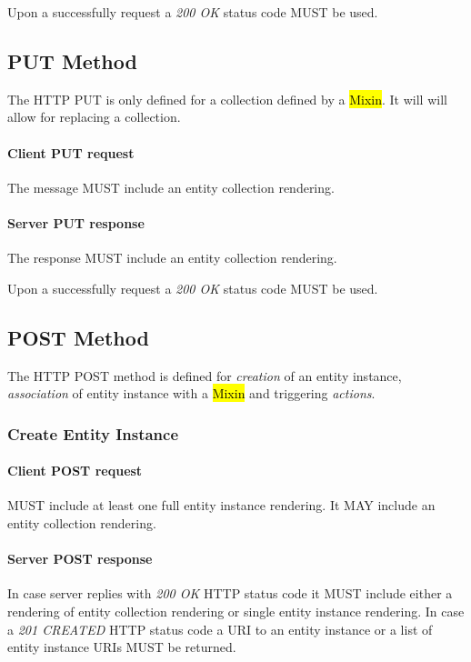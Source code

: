 \documentclass[10pt,a4paper]{article}
\begin{document}
Upon a successfully request a \emph{200 OK} status code MUST be used.

\subsection{PUT Method}
The HTTP PUT is only defined for a collection defined by a \hl{Mixin}. It will will allow for replacing a collection.

\paragraph{Client PUT request}
The message MUST include an entity collection rendering.

\paragraph{Server PUT response}
The response MUST include an entity collection rendering.

Upon a successfully request a \emph{200 OK} status code MUST be used.

\subsection{POST Method}
The HTTP POST method is defined for {\em creation} of an entity instance, {\em association} of entity instance with a \hl{Mixin} and triggering {\em actions}.

\subsubsection{Create Entity Instance}

\paragraph{Client POST request}
MUST include at least one full entity instance rendering. It MAY include an entity collection rendering.

\paragraph{Server POST response}
In case server replies with \emph{200 OK} HTTP status code it MUST include either a rendering of entity collection rendering or single entity instance rendering. In case a \emph{201 CREATED} HTTP status code a URI to an entity instance or a list of entity instance URIs MUST be returned.
\end{document}
